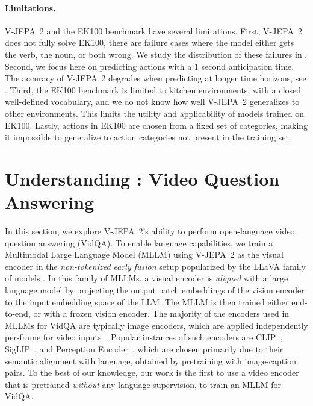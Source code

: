 \documentclass[]{fairmeta}
\newcommand{\model}{V-JEPA~2\xspace}
\begin{document}
\paragraph{\bf Limitations.} \model and the EK100 benchmark have several limitations. First, \model does not fully solve EK100, there are failure cases where the model either gets the verb, the noun, or both wrong. We study the distribution of these failures in . Second, we focus here on predicting actions with a 1 second anticipation time. The accuracy of \model degrades when predicting at longer time horizons, see . Third, the EK100 benchmark is limited to kitchen environments, with a closed well-defined vocabulary, and we do not know how well \model generalizes to other environments. This limits the utility and applicability of models trained on EK100. 
Lastly, actions in EK100 are chosen from a fixed set of categories, making it impossible to generalize to action categories not present in the training set.



\section{Understanding : Video Question Answering}
\label{section:language_understanding}

In this section, we explore \model's ability to perform open-language video question answering (VidQA). To enable language capabilities, we train a Multimodal Large Language Model (MLLM) using \model as the visual encoder in the \textit{non-tokenized early fusion} \citep{wadekar2024evolution} setup popularized by the LLaVA family of models \citep{li2024llava}. 
In this family of MLLMs, a visual encoder is \textit{aligned} with a large language model by projecting the output patch embeddings of the vision encoder to the input embedding space of the LLM. The MLLM is then trained either end-to-end, or with a frozen vision encoder.
The majority of the encoders used in MLLMs for VidQA are typically image encoders, which are applied independently per-frame for video inputs~\citep{bai2025qwen2, zhang2024llavanext-video}.
Popular instances of such encoders are CLIP~\citep{radford2021learning}, SigLIP~\citep{tschannen2025siglip}, and Perception Encoder~\citep{bolya_perception_encoder_2025}, which are chosen primarily due to their semantic alignment with language, obtained by pretraining with image-caption pairs.
To the best of our knowledge, our work is the first to use a video encoder that is pretrained \textit{without} any language supervision, to train an MLLM for VidQA. 
\end{document}
